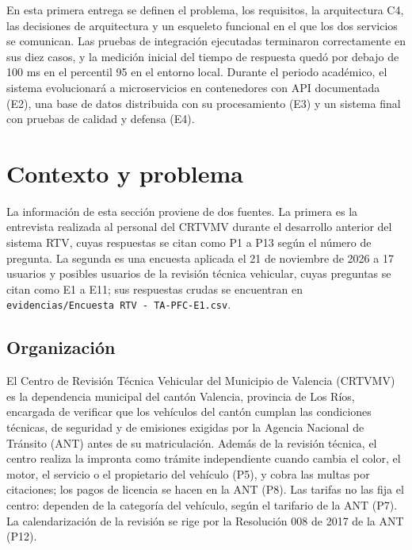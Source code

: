 \documentclass[11pt,a4paper]{article}
\begin{document}
	En esta primera entrega se definen el problema, los requisitos, la arquitectura C4, las decisiones de arquitectura y un esqueleto funcional en el que los dos servicios se comunican. Las pruebas de integración ejecutadas terminaron correctamente en sus diez casos, y la medición inicial del tiempo de respuesta quedó por debajo de 100 ms en el percentil 95 en el entorno local. Durante el periodo académico, el sistema evolucionará a microservicios en contenedores con API documentada (E2), una base de datos distribuida con su procesamiento (E3) y un sistema final con pruebas de calidad y defensa (E4).
	
	\section{Contexto y problema}
	La información de esta sección proviene de dos fuentes. La primera es la entrevista realizada al personal del CRTVMV durante el desarrollo anterior del sistema RTV, cuyas respuestas se citan como P1 a P13 según el número de pregunta. La segunda es una encuesta aplicada el 21 de noviembre de 2026 a 17 usuarios y posibles usuarios de la revisión técnica vehicular, cuyas preguntas se citan como E1 a E11; sus respuestas crudas se encuentran en \texttt{evidencias/Encuesta RTV - TA-PFC-E1.csv}.
	
	\subsection{Organización}
	El Centro de Revisión Técnica Vehicular del Municipio de Valencia (CRTVMV) es la dependencia municipal del cantón Valencia, provincia de Los Ríos, encargada de verificar que los vehículos del cantón cumplan las condiciones técnicas, de seguridad y de emisiones exigidas por la Agencia Nacional de Tránsito (ANT) antes de su matriculación. Además de la revisión técnica, el centro realiza la impronta como trámite independiente cuando cambia el color, el motor, el servicio o el propietario del vehículo (P5), y cobra las multas por citaciones; los pagos de licencia se hacen en la ANT (P8). Las tarifas no las fija el centro: dependen de la categoría del vehículo, según el tarifario de la ANT (P7). La calendarización de la revisión se rige por la Resolución 008 de 2017 de la ANT (P12).
	
\end{document}
